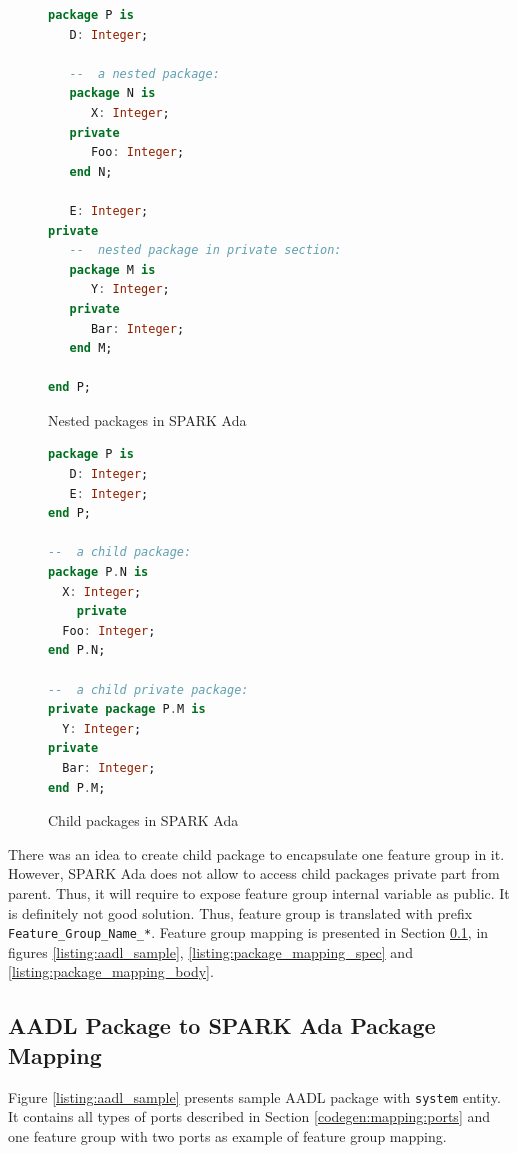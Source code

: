 \begin{figure}[ht]
\singlespacing
\begin{lstlisting}[language=ada, frame=single, gobble=0]
package P is
   D: Integer;

   --  a nested package:
   package N is
      X: Integer;
   private
      Foo: Integer;
   end N;

   E: Integer;
private
   --  nested package in private section:
   package M is
      Y: Integer;
   private
      Bar: Integer;
   end M;

end P;
\end{lstlisting}
\doublespacing
\caption{Nested packages in SPARK Ada}
\label{listing:nested_packages}
\end{figure}

\begin{figure}[ht]
\singlespacing
\begin{lstlisting}[language=ada, frame=single, gobble=0]
package P is
   D: Integer;
   E: Integer;
end P;

--  a child package:
package P.N is
  X: Integer;
	private
  Foo: Integer;
end P.N;

--  a child private package:
private package P.M is
  Y: Integer;
private
  Bar: Integer;
end P.M;
\end{lstlisting}
\doublespacing
\caption{Child packages in SPARK Ada}
\label{listing:child_packages}
\end{figure}

There was an idea to create child package to encapsulate one feature group in it. However, SPARK Ada does not allow to access child packages private part from parent. Thus, it will require to expose feature group internal variable as public. It is definitely not good solution. Thus, feature group is translated with prefix \lstinline{Feature_Group_Name_*}. Feature group mapping is presented in Section \ref{codegen:mapping:packages}, in figures \ref{listing:aadl_sample}, \ref{listing:package_mapping_spec} and \ref{listing:package_mapping_body}.


\subsection{AADL Package to SPARK Ada Package Mapping}
\label{codegen:mapping:packages}

Figure \ref{listing:aadl_sample} presents sample AADL package with \lstinline{system} entity. It contains all types of ports described in Section \ref{codegen:mapping:ports} and one feature group with two ports as example of feature group mapping.

